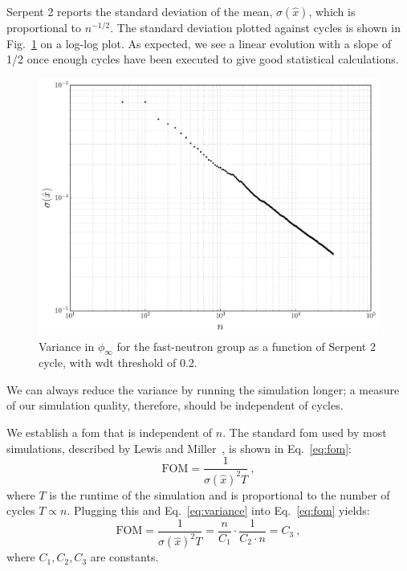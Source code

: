 Serpent 2 reports the standard deviation of the mean,
$\sigma(\hat{x})$, which is proportional to $n^{-1/2}$. The standard deviation
plotted against cycles is shown in Fig.~\ref{fig:error_convergence} on
a log-log plot. As expected, we see a linear evolution with a slope of
1/2 once enough cycles have been executed to give good statistical calculations.
\begin{figure}[hbtp]
  \centering
  \includegraphics[scale=0.5]{images/error_convergence}
  \caption[Variance in $\phi_{\infty}$ for the fast-neutron group as a
    function of Serpent 2 cycle.]{Variance in $\phi_{\infty}$ for the fast-neutron group as a
    function of Serpent 2 cycle, with \gls{wdt} threshold of 0.2.}
  \label{fig:error_convergence}
\end{figure}
We can always reduce the variance by running the simulation longer; a
measure of our simulation quality, therefore, should be independent of
cycles. 

We establish a \gls{fom} that is independent of $n$.  The
standard \gls{fom} used by most simulations, described by Lewis and
Miller~\cite{lewis1993}, is shown in Eq.~\eqref{eq:fom}:
\begin{equation}
  \label{eq:fom}
  \mathrm{FOM} = \frac{1}{\sigma(\hat{x})^2T}\:,
\end{equation}
where $T$ is the runtime of the simulation and is proportional to the number
of cycles $T \propto n$. Plugging this and
Eq.~\eqref{eq:variance} into Eq.~\eqref{eq:fom} yields:
\begin{equation*}
  \mathrm{FOM} = \frac{1}{\sigma(\hat{x})^2T} =
  \frac{n}{C_1}\cdot\frac{1}{C_2\cdot n} = C_3\:,
\end{equation*}
where $C_1,C_2,C_3$ are constants. 

